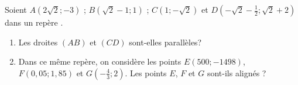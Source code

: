 
Soient $A(2\sqrt{2};-3)$  ; $B(\sqrt{2}-1;1)$  ;  $C(1;-\sqrt{2})$  et  $D(-\sqrt{2}-\frac{1}{2};\sqrt{2}+2)$    dans un repère \Oij.
\begin{enumerate}
\item Les droites $(AB)$ et $(CD)$ sont-elles parallèles?
\item Dans ce même repère, on considère les points $E(500;-1498)$, $F(0,05;1,85)$  et $G \left( -\frac{4}{3};2 \right)$. Les points $E$, $F$ et $G$ sont-ils alignés ?
\end{enumerate}